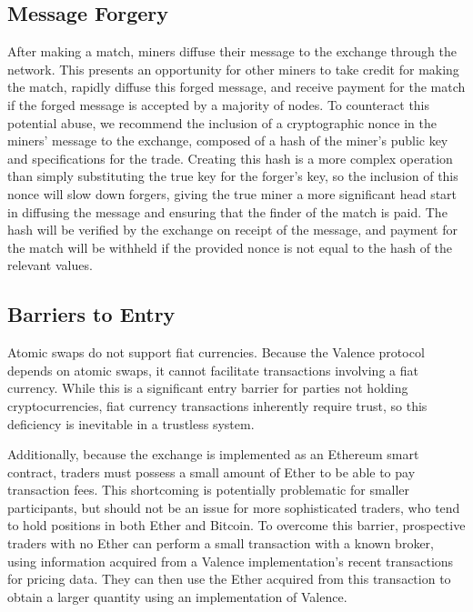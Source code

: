 \documentclass[a4paper]{article}
\begin{document}
  \subsection*{Message Forgery}
		After making a match, miners diffuse their message to the exchange through the network.
		This presents an opportunity for other miners to take credit for making the
		match, rapidly diffuse this forged message, and receive payment for the match
		if the forged message is accepted by a majority of nodes. To counteract this
		potential abuse, we recommend the inclusion of a cryptographic nonce in the miners'
		message to the exchange, composed of a hash of the miner's public key and specifications
		for the trade. Creating this hash is a more complex operation than simply substituting the true
		key for the forger's key, so the inclusion of this nonce will slow down forgers, giving the true
		miner a more significant head start in diffusing the message and ensuring that the finder of the
		match is paid. The hash will be verified by the exchange on receipt of the message, and payment for the match will be withheld if the provided nonce is not equal to the hash of the relevant values.

  \subsection*{Barriers to Entry}
  	Atomic swaps do not support fiat currencies.
  	Because the Valence protocol depends on atomic swaps, it cannot
    facilitate transactions involving a fiat currency. While this is a
    significant entry barrier for parties not holding cryptocurrencies,
    fiat currency transactions inherently require trust, so this deficiency
    is inevitable in a trustless system.

    Additionally, because the exchange is implemented as an Ethereum smart
    contract, traders must possess a small amount of Ether to be able to pay
    transaction fees. This shortcoming is potentially problematic for
    smaller participants, but should not be an issue for more sophisticated
    traders, who tend to hold positions in both Ether and Bitcoin.
    To overcome this barrier, prospective traders with no Ether can
    perform a small transaction with a known broker, using information
    acquired from a Valence implementation's recent transactions for pricing
    data. They can then use the Ether acquired from this transaction to
    obtain a larger quantity using an implementation of Valence.
\end{document}
